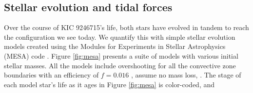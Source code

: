\subsection{Stellar evolution and tidal forces}\label{tides}
Over the course of KIC 9246715's life, both stars have evolved in tandem to reach the configuration we see today. We quantify this with simple stellar evolution models created using the Modules for Experiments in Stellar Astrophysics (MESA) code \citep{pax11,pax13,pax15}. Figure \ref{fig:mesa} presents a suite of models with various initial stellar masses. All the models include overshooting for all the convective zone boundaries with an efficiency of $f = 0.016$ \citep{her00}, assume no mass loss, . The stage of each model star's life as it ages in Figure \ref{fig:mesa} is color-coded, and 

